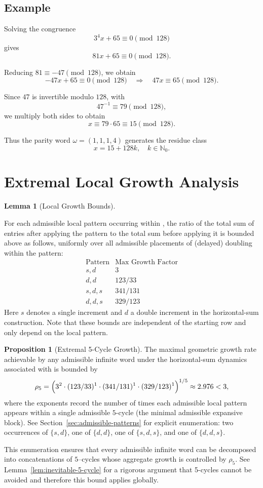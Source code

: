 \documentclass[12pt, oneside]{article}   	%
\numberwithin{equation}{section}          %
\theoremstyle{definition}
\newtheorem{proposition}{Proposition}[section]
\newtheorem{lemma}[theorem]{Lemma}
\begin{document}
\subsection{Example}
Solving the congruence
\[
3^4 x + 65 \equiv 0 \pmod{128}
\]
gives
\[
81x + 65 \equiv 0 \pmod{128}.
\]

Reducing $81 \equiv -47 \pmod{128}$, we obtain
\[
-47x + 65 \equiv 0 \pmod{128}
\quad \Longrightarrow \quad
47x \equiv 65 \pmod{128}.
\]

Since $47$ is invertible modulo $128$, with
\[
47^{-1} \equiv 79 \pmod{128},
\]
we multiply both sides to obtain
\[
x \equiv 79 \cdot 65 \equiv 15 \pmod{128}.
\]

Thus the parity word $\omega = (1,1,1,4)$ generates the residue class
\[
x = 15 + 128k, \quad k \in \mathbb{N}_0.
\]


\newpage
\section{Extremal Local Growth Analysis}

\begin{lemma}[Local Growth Bounds]
\label{lem:local-growth-bounds}

For each admissible local pattern occurring within ,
the ratio of the total sum of entries after applying the pattern
to the total sum before applying it is bounded above as follows,
uniformly over all admissible placements of (delayed) doubling within
the pattern:
\[
\begin{array}{c|c}
\text{Pattern} & \text{Max Growth Factor} \\
\hline
s,d & 3 \\
d,d & 123/33 \\
s,d,s & 341/131 \\
d,d,s & 329/123
\end{array}
\]
Here $s$ denotes a single increment and $d$ a double increment in the
horizontal-sum construction.  Note that these bounds are independent
of the starting row and only depend on the local pattern.
\end{lemma}

\begin{proposition}[Extremal 5-Cycle Growth]
\label{prop:extremal-5-cycle}
The maximal geometric growth rate achievable by any admissible infinite
word under the horizontal-sum dynamics associated with  is bounded by
\[
\rho_{5}
=
\Bigl(
3^{2}
\cdot (123/33)^1
\cdot (341/131)^1
\cdot (329/123)^1
\Bigr)^{1/5}
\approx 2.976
< 3,
\]
where the exponents record the number of times each admissible local pattern
appears within a single admissible $5$-cycle (the minimal admissible expansive
block).  See Section~\ref{sec:admissible-patterns} for explicit enumeration:
two occurrences of $\{s,d\}$, one of $\{d,d\}$, one of $\{s,d,s\}$, and one
of $\{d,d,s\}$.

This enumeration ensures that every admissible infinite word can be decomposed
into concatenations of $5$--cycles whose aggregate growth is controlled by
\(\rho_5\). See Lemma~\ref{lem:inevitable-5-cycle} for a rigorous argument
that 5-cycles cannot be avoided and therefore this bound applies globally.
\end{proposition}
\end{document}
